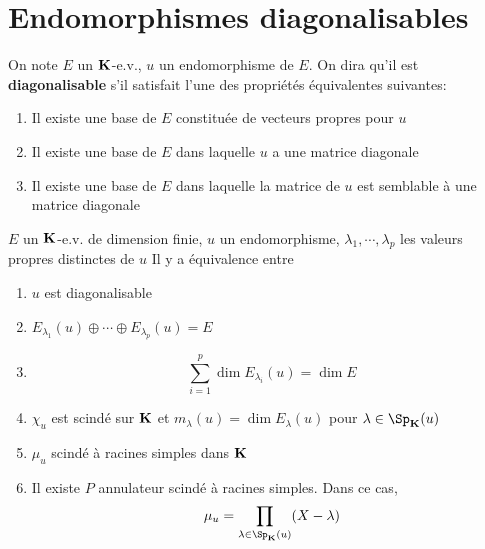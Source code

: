 \section{Endomorphismes diagonalisables}

\begin{defprop}
    On note $E$ un $\mathbf K$-e.v., $u$ un endomorphisme de $E$. On dira qu'il est \textbf{diagonalisable} s'il satisfait l'une des propriétés équivalentes suivantes: \begin{enumerate}
        \item Il existe une base de $E$ constituée de vecteurs propres pour $u$
        \item Il existe une base de $E$ dans laquelle $u$ a une matrice diagonale
        \item Il existe une base de $E$ dans laquelle la matrice de $u$ est semblable à une matrice diagonale
    \end{enumerate}
\end{defprop}

\begin{thm}
    \Hyp $E$ un $\mathbf K$-e.v. de dimension finie, $u$ un endomorphisme, $\lambda_1, \cdots, \lambda_p$ les valeurs propres distinctes de $u$
    \Conc Il y a équivalence entre \begin{enumerate}[label=(\alph{enumi})]
        \item $u$ est diagonalisable
        \item $E_{\lambda_1}(u)\oplus \cdots \oplus E_{\lambda_p}(u)=E$
        \item \[
                \sum_{i=1}^p\dim E_{\lambda_i}(u)=\dim E
            \]
        \item $\chi_u$ est scindé sur $\mathbf K$ et $m_{\lambda}(u)=\dim E_{\lambda}(u)$ pour $\lambda\in\Sp_{\K}(u)$
        \item $\mu_u$ scindé à racines simples dans $\mathbf K$
        \item Il existe $P$ annulateur scindé à racines simples. Dans ce cas, \[
                \mu_u=\prod_{\lambda\in\Sp_{\K}(u)}(X-\lambda)
            \]
    \end{enumerate}
\end{thm}

